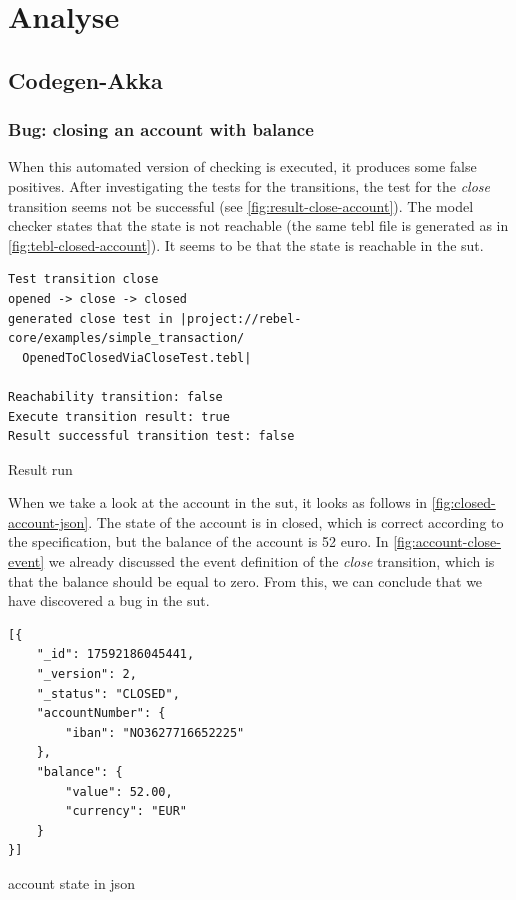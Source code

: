\section{Analyse}

\subsection{Codegen-Akka}

\subsubsection{Bug: closing an account with balance}\label{sec:bug-close-account}
When this automated version of checking is executed, it produces some false
positives. After investigating the tests for the transitions, the test for the \textit{close}
transition seems not be successful (see \autoref{fig:result-close-account}).
The model checker states that the state is not reachable (the same tebl file is
generated as in \autoref{fig:tebl-closed-account}). It seems to be that the
state is reachable in the \gls{sut}.

\begin{sourcecode}[h!]
\begin{lstlisting}[]
Test transition close
opened -> close -> closed
generated close test in |project://rebel-core/examples/simple_transaction/
  OpenedToClosedViaCloseTest.tebl|

Reachability transition: false
Execute transition result: true
Result successful transition test: false
\end{lstlisting}
\caption{Result run}\label{fig:result-close-account}
\end{sourcecode}
\FloatBarrier

When we take a look at the account in the \gls{sut}, it looks as
follows in \autoref{fig:closed-account-json}. The state of the account is in
closed, which is correct according to the specification, but the balance of the
account is 52 euro. In \autoref{fig:account-close-event} we already discussed
the event  definition of the \textit{close} transition, which is that the
balance should be equal to zero. From this, we can conclude that we have
discovered a bug in the \gls{sut}.

\begin{sourcecode}[h!]
\begin{lstlisting}[]
[{
	"_id": 17592186045441,
	"_version": 2,
	"_status": "CLOSED",
	"accountNumber": {
		"iban": "NO3627716652225"
	},
	"balance": {
		"value": 52.00,
		"currency": "EUR"
	}
}]
\end{lstlisting}
\caption{account state in json}\label{fig:closed-account-json}
\end{sourcecode}
\FloatBarrier


